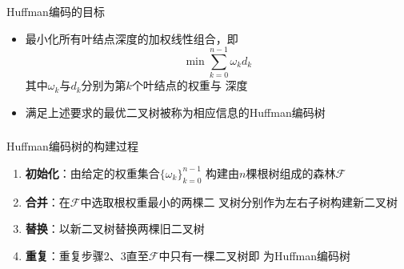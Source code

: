 \begin{frame}
    \frametitle{\insertsubsectionhead}
    \begin{block}{Huffman编码的目标}
        \begin{itemize}
            \item 最小化所有叶结点深度的加权线性组合，即
                \[
                    \min_{}{\sum_{k=0}^{n-1}{\omega_{k}d_{k}}}
                \]
                其中$\omega_{k}$与$d_{k}$分别为第$k$个叶结点的\alert{权重}与
                \alert{深度}
            \item 满足上述要求的最优二叉树被称为相应信息的Huffman编码树
        \end{itemize}
    \end{block}
\end{frame}

\begin{frame}
    \frametitle{\insertsubsectionhead}
    \begin{block}{Huffman编码树的构建过程}
        \begin{enumerate}
            \item \textbf{初始化}：由给定的权重集合$\{\omega_{k}\}_{k=0}^{n-1}$
                  构建由$n$棵根树组成的\alert{森林}$\mathcal{F}$
            \item \textbf{合并}：在$\mathcal{F}$中选取根权重\alert{最小}的两棵二
                  叉树分别作为左右子树构建新二叉树
            \item \textbf{替换}：以新二叉树替换两棵旧二叉树
            \item \textbf{重复}：重复步骤2、3直至$\mathcal{F}$中只有一棵二叉树即
                  为Huffman编码树
        \end{enumerate}
    \end{block}
\end{frame}

